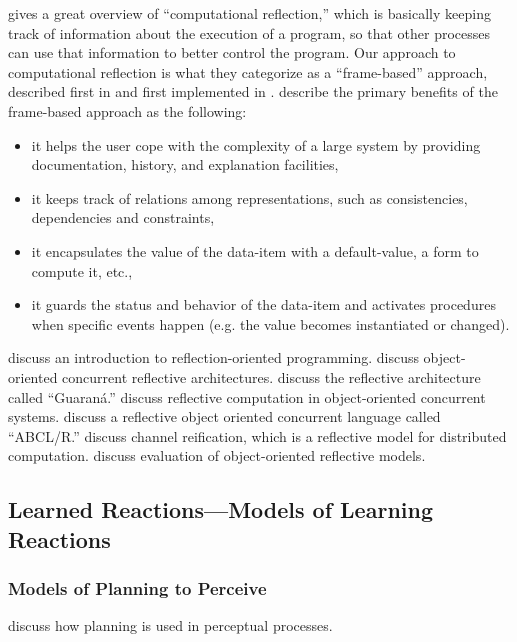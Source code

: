 \cite{maes:1987} gives a great overview of ``computational reflection,'' which is basically keeping track of information about the execution of a program, so that other processes can use that information to better control the program.
Our approach to computational reflection is what they categorize as a ``frame-based'' approach, described first in \cite{minsky:1975} and first implemented in \cite{roberts:1977}.
\cite{maes:1987} describe the primary benefits of the frame-based approach as the following:

\begin{itemize}
\item{it helps the user cope with the complexity of a large system by providing documentation, history, and explanation facilities,}
\item{it keeps track of relations among representations, such as consistencies, dependencies and constraints,}
\item{it encapsulates the value of the data-item with a default-value, a form to compute it, etc.,}
\item{it guards the status and behavior of the data-item and activates procedures when specific events happen (e.g. the value becomes instantiated or changed).}
\end{itemize}

\cite{sobel:1996} discuss an introduction to reflection-oriented programming.
\cite{matsuoka:1992} discuss object-oriented concurrent reflective architectures.
\cite{oliva:1998} discuss the reflective architecture called ``Guaraná.''
\cite{watanabe:1989} discuss reflective computation in object-oriented concurrent systems.
\cite{yonezawa:1990} discuss a reflective object oriented concurrent language called ``ABCL/R.''
\cite{ancona:1998} discuss channel reification, which is a reflective model for distributed computation.
\cite{cazzola:1998} discuss evaluation of object-oriented reflective models.

\subsection{Learned Reactions---Models of Learning Reactions}

\subsubsection{Models of Planning to Perceive}

\cite{pryorcollins:1995} discuss how planning is used in perceptual processes.

